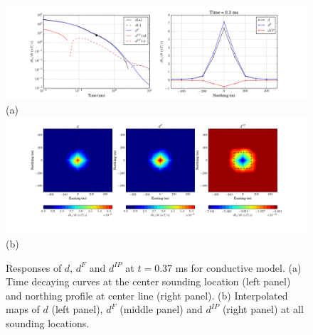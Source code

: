 \documentclass[a4paper, 11pt]{article}
\begin{document}
\begin{figure}[htb]
  \centering
  \includegraphics[height=0.2\textheight]{figures/synthetic/EMIPCase2_ch20_profile.png} \\ (a)
  \\
  \includegraphics[height=0.25\textheight]{figures/synthetic/EMIPCase2_ch20_plan.png} \\ (b)
  \caption{Responses of $d$, $d^{F}$ and $d^{IP}$ at $t=0.37$ ms for conductive model. (a) Time decaying curves at the center sounding location (left panel) and northing profile at center line (right panel). (b) Interpolated maps of $d$ (left panel), $d^{F}$ (middle panel) and $d^{IP}$ (right panel) at all sounding locations. }
  \label{F: EMIPresp1_case2}
\end{figure}
\end{document}
